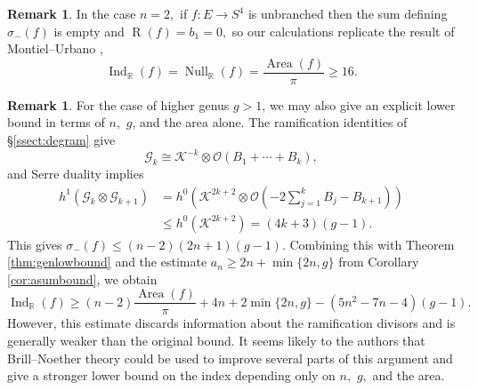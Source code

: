 \documentclass[11pt]{article}
\theoremstyle{definition}
\newtheorem{rmk}[theorem]{Remark}
\newcommand{\R}{\mathbb{R}}
\numberwithin{equation}{section}
\begin{document}
\begin{rmk}
    In the case $n=2,$ if $f : E \to S^4$ is unbranched then the sum defining $\sigma_-(f)$ is empty and $\operatorname{R}(f) = b_1 = 0,$ so our calculations replicate the result of Montiel--Urbano \cite{MontUrb97},
    \begin{equation*}
        \operatorname{Ind}_\R(f) = \operatorname{Null}_\R(f) = \frac{\operatorname{Area}(f)}{\pi} \geq 16.
    \end{equation*}
\end{rmk}

\begin{rmk}
    For the case of higher genus $g>1$, we may also give an explicit lower bound in terms of $n,$ $g$, and the area alone. The ramification identities of \S\ref{ssect:degram} give
    \begin{equation*}
        \mathcal{G}_k \cong \mathcal{K}^{-k} \otimes \mathcal{O}(B_1+\cdots+B_k),
    \end{equation*}
    and Serre duality implies
    \begin{equation*}
        \begin{aligned}
        h^1(\mathcal{G}_k\otimes\mathcal{G}_{k+1}) & = h^0 \left( \mathcal{K}^{2k+2} \otimes  \mathcal{O} \left( -2\sum_{j=1}^k B_j - B_{k+1} \right) \right) \\
        &\leq h^0(\mathcal{K}^{2k+2}) = (4k+3)(g-1).
    \end{aligned}
    \end{equation*}
    This gives $\sigma_-(f)\leq(n-2)(2n+1)(g-1).$ Combining this with Theorem \ref{thm:genlowbound} and the estimate $a_n\geq2n+\min\{2n,g\}$ from Corollary \ref{cor:asumbound}, we obtain
    \begin{equation*}
        \operatorname{Ind}_{\R}(f) \geq (n-2)\frac{\operatorname{Area}(f)}{\pi} + 4n + 2 \min\{2n,g\} -(5n^2-7n-4)(g-1).
    \end{equation*}
    However, this estimate discards information about the ramification divisors and is generally weaker than the original bound. It seems likely to the authors that Brill--Noether theory could be used to improve several parts of this argument and give a stronger lower bound on the index depending only on $n,$ $g,$ and the area.
    \end{rmk}


{\small
}
{\footnotesize
\Addresses}

	
\end{document}
